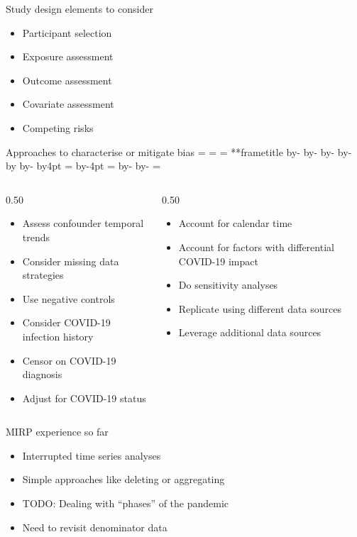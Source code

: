 \documentclass[aspectratio=169,12pt]{beamer} %
\makeatletter
\newif\ifsidebartheme
\newcommand*{\calculatespace}{%
    \contentheight=\paperheight%
    \ifx\beamer@frametitle\@empty%
        \setbox\@tempboxa=\box\voidb@x%
      \else%
        \setbox\@tempboxa=\vbox{%
          \vbox{}%
          {\parskip0pt\usebeamertemplate***{frametitle}}%
        }%
        \ifsidebartheme%
          \advance\contentheight by-1em%
        \fi%
      \fi%
    \advance\contentheight by-\ht\@tempboxa%
    \advance\contentheight by-\dp\@tempboxa%
    \advance\contentheight by-\beamer@frametopskip%
    \ifbeamer@plainframe%
    \contentbottom=0pt%
    \else%
    \advance\contentheight by-\headheight%
    \advance\contentheight by\headdp%
    \advance\contentheight by-\footheight%
    \advance\contentheight by4pt%
    \contentbottom=\footheight%
    \advance\contentbottom by-4pt%
    \fi%
    \contentwidth=\paperwidth%
    \ifbeamer@plainframe%
    \contentleft=0pt%
    \else%
    \advance\contentwidth by-\beamer@rightsidebar%
    \advance\contentwidth by-\beamer@leftsidebar\relax%
    \contentleft=\beamer@leftsidebar%
    \fi%
}
\makeatother
\begin{document}
\begin{frame}{Study design elements to consider}
	\begin{itemize}
		\item Participant selection
		\item Exposure assessment
		\item Outcome assessment
		\item Covariate assessment
		\item Competing risks
	\end{itemize}
\end{frame}

\begin{frame}{Approaches to characterise or mitigate bias}
\calculatespace%
\begin{columns}
\begin{column}{0.50\contentwidth}
	\begin{itemize}
		\item Assess confounder temporal trends
		\item Consider missing data strategies
		\item Use negative controls
		\item Consider COVID-19 infection history
		\item Censor on COVID-19 diagnosis
		\item Adjust for COVID-19 status
	\end{itemize}
\end{column}
\begin{column}{0.50\contentwidth}
	\begin{itemize}
		\item Account for calendar time
		\item Account for factors with differential COVID-19 impact
		\item Do sensitivity analyses
		\item Replicate using different data sources
		\item Leverage additional data sources
	\end{itemize}
\end{column}
\end{columns}
\end{frame}

\begin{frame}{MIRP experience so far}
	\begin{itemize}
		\item Interrupted time series analyses
		\item Simple approaches like deleting or aggregating
		\item TODO: Dealing with ``phases'' of the pandemic
		\item Need to revisit denominator data
	\end{itemize}
\end{frame}
\end{document}
